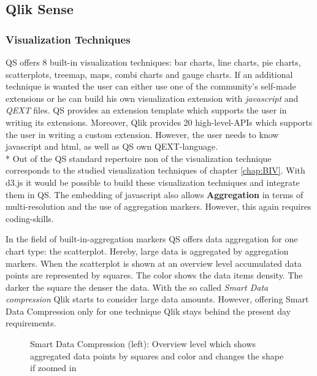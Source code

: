 \subsection*{Qlik Sense}

\subsubsection*{Visualization Techniques}
QS offers 8 built-in visualization techniques: bar charts, line charts, pie charts, scatterplots, treemap, maps, combi charts and gauge charts. If an additional technique is wanted the user can either use one of the community's self-made extensions or he can build his own visualization extension with \textit{javascript} and \textit{QEXT} files\cite{qlikWorkbench}. QS provides an extension template which supports the user in writing its extensions. Moreover, Qlik provides 20 high-level-APIs which supports the user in writing a custom extension. However, the user needs to know javascript and html\cite{qlikVisExtensions}, as well as QS own QEXT-language. \\*
Out of the QS standard repertoire non of the visualization technique corresponds to the studied visualization techniques of chapter \ref{chap:BIV}. With d3.js it would be possible to build these visualization techniques and integrate them in QS. 
The embedding of javascript also allows \textbf{Aggregation} in terms of multi-resolution and the use of aggregation markers. However, this again requires coding-skills. 

In the field of built-in-aggregation markers QS offers data aggregation for one chart type: the scatterplot. Hereby, large data is aggregated by aggregation markers. When the scatterplot is shown at an overview level accumulated data points are represented by squares. The color shows the data items density. The darker the square the denser the data\cite{qlikScatter}. With the so called \textit{Smart Data compression} Qlik starts to consider large data amounts. However, offering Smart Data Compression only for one technique Qlik stays behind the present day requirements.


\begin{figure}[H]
    \centering
    \caption{Smart Data Compression (left): Overview level which shows aggregated data points by squares and color and changes the shape if zoomed in}
    \label{fig:smartdatacompression}
\end{figure}

